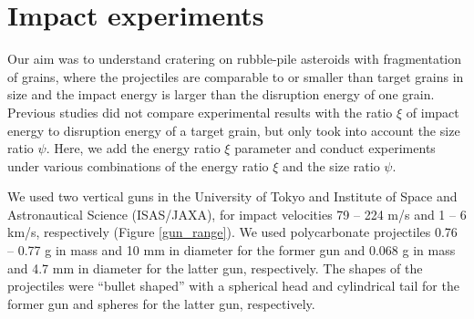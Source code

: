 \documentclass[3p,authoryear]{elsarticle}
\begin{document}
 \section{Impact experiments} \label{sec:experiment}
Our aim was to understand cratering on rubble-pile asteroids with fragmentation of grains, where the projectiles are comparable to or smaller than target grains in size and the impact energy is larger than the disruption energy of one grain. Previous studies did not compare experimental results with the ratio $\xi$ of impact energy to disruption energy of a target grain, but only took into account the size ratio $\psi$. Here, we add the energy ratio $\xi$ parameter and conduct experiments under various combinations of the energy ratio $\xi$ and the size ratio $\psi$.

We used two vertical guns in the University of Tokyo and Institute of Space and Astronautical Science (ISAS/JAXA), for impact velocities 79 -- 224 m/s and 1 -- 6 km/s, respectively (Figure \ref{gun_range}). We used polycarbonate projectiles 0.76 -- 0.77 g in mass and 10 mm in diameter for the former gun and 0.068 g in mass and 4.7 mm in diameter for the latter gun, respectively.
The shapes of the projectiles were ``bullet shaped'' with a spherical head and cylindrical tail for the former gun and spheres for the latter gun, respectively.
\end{document}
